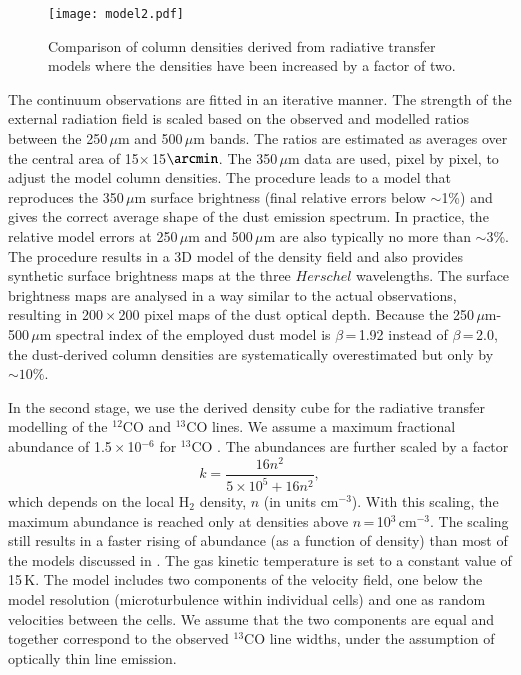\documentclass[printer]{aa}
\begin{document}
\begin{appendix}
\begin{figure}[tp]
\texttt{[image: model2.pdf]}
\caption{
% 
Comparison of column densities derived from radiative transfer models where the
densities have been increased by a factor of two.
%
}
\label{model2}
\end{figure}

The continuum observations are fitted in an iterative manner. The strength of the
external radiation field is scaled based on the observed and modelled ratios between the
250\,$\mu$m and 500\,$\mu$m bands. The ratios are estimated as averages over the central
area of 15$\times$\,15$\arcmin$. The 350\,$\mu$m data are used, pixel by pixel, to
adjust the model column densities. The procedure leads to a model that reproduces the
350\,$\mu$m surface brightness (final relative errors below $\sim$1\%) and gives the
correct average shape of the dust emission spectrum. In practice, the relative model errors at 250\,$\mu$m
and 500\,$\mu$m are also typically no more than $\sim$3\%. The procedure results in a 3D
model of the density field and also provides synthetic surface brightness maps at the
three $Herschel$ wavelengths. The surface brightness maps are analysed in a way similar
to the actual observations, resulting in 200\,$\times$\,200 pixel maps of the dust optical
depth. Because the 250\,$\mu$m-500\,$\mu$m spectral index of the employed dust model is
$\beta$\,=\,1.92 instead of $\beta$\,=\,2.0, the dust-derived column densities are
systematically overestimated but only by $\sim10\%$.

In the second stage, we use the derived density cube for the radiative transfer
modelling of the $^{12}$CO and $^{13}$CO lines. We assume a maximum fractional abundance of 1.5\,$\times$\,10$^{-6}$ for $^{13}$CO \citep{frerking1982,harjunpaa2004}. The abundances
are further scaled by a factor
\begin{equation}
k =  \frac{16 n^2}{5\times 10^{5}+16 n^2},
\end{equation}
which depends on the local H$_2$ density, $n$ (in units cm$^{-3}$). With this scaling,
the maximum abundance is reached only at densities above $n$\,=\,10$^3$\,cm$^{-3}$. The
scaling still results in a faster rising of abundance (as a function of density) than
most of the models discussed in \citet{glover2010}. The gas kinetic temperature is set to
a constant value of 15\,K. The model includes two components of the velocity field, one
below the model resolution (microturbulence within individual cells) and one as random
velocities between the cells. We assume that the two components are equal and together
correspond to the observed $^{13}$CO line widths, under the assumption of optically thin
line emission.


\end{appendix}
\end{document}
